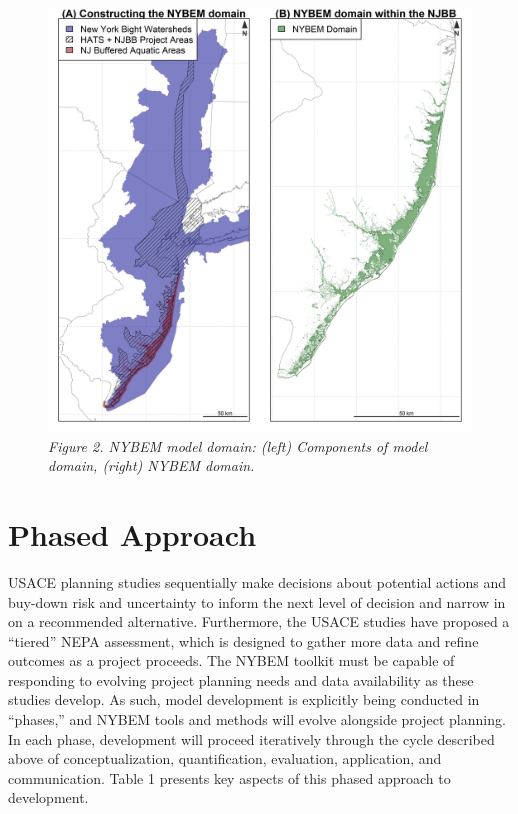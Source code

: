 \documentclass[
]{book}
\begin{document}
\begin{figure}
\centering
\includegraphics{ZZ_Fig02_NYBEM.Extent.jpeg}
\caption{\emph{Figure 2. NYBEM model domain: (left) Components of model domain, (right) NYBEM domain.}}
\end{figure}

\hypertarget{phased-approach}{%
\section{Phased Approach}\label{phased-approach}}

USACE planning studies sequentially make decisions about potential actions and buy-down risk and uncertainty to inform the next level of decision and narrow in on a recommended alternative. Furthermore, the USACE studies have proposed a ``tiered'' NEPA assessment, which is designed to gather more data and refine outcomes as a project proceeds. The NYBEM toolkit must be capable of responding to evolving project planning needs and data availability as these studies develop. As such, model development is explicitly being conducted in ``phases,'' and NYBEM tools and methods will evolve alongside project planning. In each phase, development will proceed iteratively through the cycle described above of conceptualization, quantification, evaluation, application, and communication. Table 1 presents key aspects of this phased approach to development.
\end{document}
